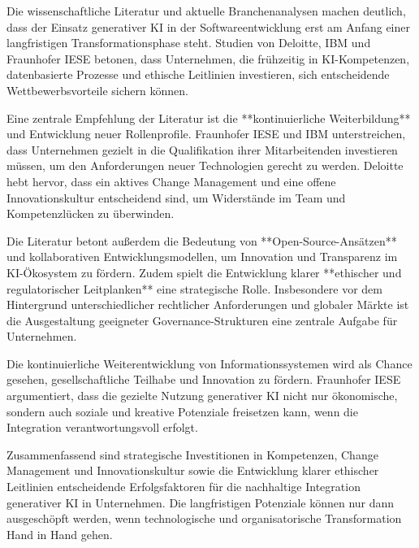 
Die wissenschaftliche Literatur und aktuelle Branchenanalysen machen deutlich,
dass der Einsatz generativer KI in der Softwareentwicklung erst am Anfang einer
langfristigen Transformationsphase steht. Studien von Deloitte, IBM und
Fraunhofer IESE\cite{siebert_generative_2024, a_ki_2024, s_future_2024}
betonen, dass Unternehmen, die frühzeitig in KI-Kompetenzen, datenbasierte
Prozesse und ethische Leitlinien investieren, sich entscheidende
Wettbewerbsvorteile sichern können.

Eine zentrale Empfehlung der Literatur ist die **kontinuierliche
Weiterbildung** und Entwicklung neuer Rollenprofile. Fraunhofer IESE und
IBM\cite{siebert_generative_2024, a_ki_2024} unterstreichen, dass Unternehmen
gezielt in die Qualifikation ihrer Mitarbeitenden investieren müssen, um den
Anforderungen neuer Technologien gerecht zu werden.
Deloitte\cite{s_future_2024} hebt hervor, dass ein aktives Change Management
und eine offene Innovationskultur entscheidend sind, um Widerstände im Team und
Kompetenzlücken zu überwinden.

Die Literatur betont außerdem die Bedeutung von **Open-Source-Ansätzen** und
kollaborativen Entwicklungsmodellen, um Innovation und Transparenz im
KI-Ökosystem zu fördern\cite{siebert_generative_2024, a_ki_2024}. Zudem spielt
die Entwicklung klarer **ethischer und regulatorischer Leitplanken** eine
strategische Rolle. Insbesondere vor dem Hintergrund unterschiedlicher
rechtlicher Anforderungen und globaler Märkte ist die Ausgestaltung geeigneter
Governance-Strukturen eine zentrale Aufgabe für
Unternehmen\cite{siebert_generative_2024, s_future_2024}.

Die kontinuierliche Weiterentwicklung von Informationssystemen wird als Chance
gesehen, gesellschaftliche Teilhabe und Innovation zu fördern. Fraunhofer
IESE\cite{siebert_generative_2024} argumentiert, dass die gezielte Nutzung
generativer KI nicht nur ökonomische, sondern auch soziale und kreative
Potenziale freisetzen kann, wenn die Integration verantwortungsvoll erfolgt.

Zusammenfassend sind strategische Investitionen in Kompetenzen, Change
Management und Innovationskultur sowie die Entwicklung klarer ethischer
Leitlinien entscheidende Erfolgsfaktoren für die nachhaltige Integration
generativer KI in Unternehmen. Die langfristigen Potenziale können nur dann
ausgeschöpft werden, wenn technologische und organisatorische Transformation
Hand in Hand gehen.

